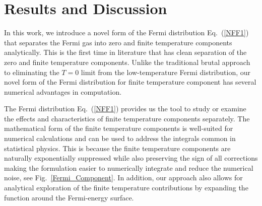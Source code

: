 \documentclass[sn-mathphys,Numbered]{sn-jnl}
\begin{document}






\section{Results and Discussion}
\label{sec12}
In this work, we introduce a novel form of the Fermi distribution Eq.~(\ref{NFF1}) that separates the Fermi gas into zero and finite temperature components analytically. This is the first time in literature that has clean separation of the zero and finite temperature components. Unlike the traditional brutal approach to eliminating the $T=0$ limit from the low-temperature Fermi distribution, our novel form of the Fermi distribution for finite temperature component has several numerical advantages in computation. 

The Fermi distribution Eq.~(\ref{NFF1}) provides us the tool to study or examine the effects and characteristics of finite temperature components separately. The mathematical form of the finite temperature components is well-suited for numerical calculations and can be used to address the integrals common in statistical physics. This is because the finite temperature components are naturally exponentially suppressed while also preserving the sign of all corrections making the formulation easier to numerically integrate and reduce the numerical noise, see Fig.~\ref{Fermi_Component}. In addition, our approach also allows for analytical exploration of the finite temperature contributions by expanding the function around the Fermi-energy surface.
\end{document}
